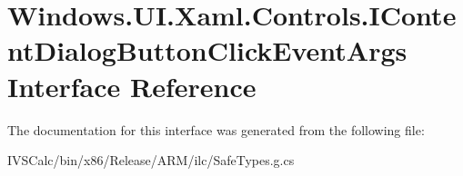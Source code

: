 \hypertarget{interface_windows_1_1_u_i_1_1_xaml_1_1_controls_1_1_i_content_dialog_button_click_event_args}{}\section{Windows.\+U\+I.\+Xaml.\+Controls.\+I\+Content\+Dialog\+Button\+Click\+Event\+Args Interface Reference}
\label{interface_windows_1_1_u_i_1_1_xaml_1_1_controls_1_1_i_content_dialog_button_click_event_args}


The documentation for this interface was generated from the following file\+:\begin{DoxyCompactItemize}
\item 
I\+V\+S\+Calc/bin/x86/\+Release/\+A\+R\+M/ilc/Safe\+Types.\+g.\+cs\end{DoxyCompactItemize}
